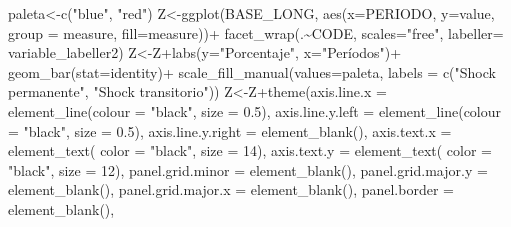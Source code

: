 \documentclass[
]{book}
\newenvironment{Shaded}{\begin{snugshade}}{\end{snugshade}}
\newcommand{\AttributeTok}[1]{\textcolor[rgb]{0.77,0.63,0.00}{#1}}
\newcommand{\DecValTok}[1]{\textcolor[rgb]{0.00,0.00,0.81}{#1}}
\newcommand{\FloatTok}[1]{\textcolor[rgb]{0.00,0.00,0.81}{#1}}
\newcommand{\FunctionTok}[1]{\textcolor[rgb]{0.00,0.00,0.00}{#1}}
\newcommand{\NormalTok}[1]{#1}
\newcommand{\OtherTok}[1]{\textcolor[rgb]{0.56,0.35,0.01}{#1}}
\newcommand{\SpecialCharTok}[1]{\textcolor[rgb]{0.00,0.00,0.00}{#1}}
\newcommand{\StringTok}[1]{\textcolor[rgb]{0.31,0.60,0.02}{#1}}
\begin{document}
\begin{Shaded}
\begin{Highlighting}[]
\NormalTok{paleta}\OtherTok{\textless{}{-}}\FunctionTok{c}\NormalTok{(}\StringTok{"blue"}\NormalTok{, }\StringTok{"red"}\NormalTok{)}
\NormalTok{Z}\OtherTok{\textless{}{-}}\FunctionTok{ggplot}\NormalTok{(BASE\_LONG, }\FunctionTok{aes}\NormalTok{(}\AttributeTok{x=}\NormalTok{PERIODO, }\AttributeTok{y=}\NormalTok{value, }\AttributeTok{group =}\NormalTok{ measure,}
                         \AttributeTok{fill=}\NormalTok{measure))}\SpecialCharTok{+}
  \FunctionTok{facet\_wrap}\NormalTok{(.}\SpecialCharTok{\textasciitilde{}}\NormalTok{CODE, }\AttributeTok{scales=}\StringTok{"free"}\NormalTok{, }\AttributeTok{labeller=}\NormalTok{ variable\_labeller2)}
\NormalTok{Z}\OtherTok{\textless{}{-}}\NormalTok{Z}\SpecialCharTok{+}\FunctionTok{labs}\NormalTok{(}\AttributeTok{y=}\StringTok{"Porcentaje"}\NormalTok{,}
          \AttributeTok{x=}\StringTok{"Períodos"}\NormalTok{)}\SpecialCharTok{+}
  \FunctionTok{geom\_bar}\NormalTok{(}\AttributeTok{stat=}\StringTok{\textquotesingle{}identity\textquotesingle{}}\NormalTok{)}\SpecialCharTok{+}
  \FunctionTok{scale\_fill\_manual}\NormalTok{(}\AttributeTok{values=}\NormalTok{paleta,}
                     \AttributeTok{labels =} \FunctionTok{c}\NormalTok{(}\StringTok{"Shock permanente"}\NormalTok{, }
                                \StringTok{"Shock transitorio"}\NormalTok{))}
\NormalTok{Z}\OtherTok{\textless{}{-}}\NormalTok{Z}\SpecialCharTok{+}\FunctionTok{theme}\NormalTok{(}\AttributeTok{axis.line.x =} \FunctionTok{element\_line}\NormalTok{(}\AttributeTok{colour =} \StringTok{"black"}\NormalTok{, }\AttributeTok{size =} \FloatTok{0.5}\NormalTok{),}
           \AttributeTok{axis.line.y.left  =} \FunctionTok{element\_line}\NormalTok{(}\AttributeTok{colour =} \StringTok{"black"}\NormalTok{, }\AttributeTok{size =} \FloatTok{0.5}\NormalTok{),}
           \AttributeTok{axis.line.y.right =} \FunctionTok{element\_blank}\NormalTok{(),}
           \AttributeTok{axis.text.x =} \FunctionTok{element\_text}\NormalTok{( }\AttributeTok{color =} \StringTok{"black"}\NormalTok{, }\AttributeTok{size =} \DecValTok{14}\NormalTok{),}
           \AttributeTok{axis.text.y =} \FunctionTok{element\_text}\NormalTok{( }\AttributeTok{color =} \StringTok{"black"}\NormalTok{, }\AttributeTok{size =} \DecValTok{12}\NormalTok{),}
           \AttributeTok{panel.grid.minor =} \FunctionTok{element\_blank}\NormalTok{(),}
           \AttributeTok{panel.grid.major.y =} \FunctionTok{element\_blank}\NormalTok{(),}
           \AttributeTok{panel.grid.major.x =} \FunctionTok{element\_blank}\NormalTok{(),}
           \AttributeTok{panel.border =} \FunctionTok{element\_blank}\NormalTok{(),}

\end{Highlighting}
\end{Shaded}
\end{document}
